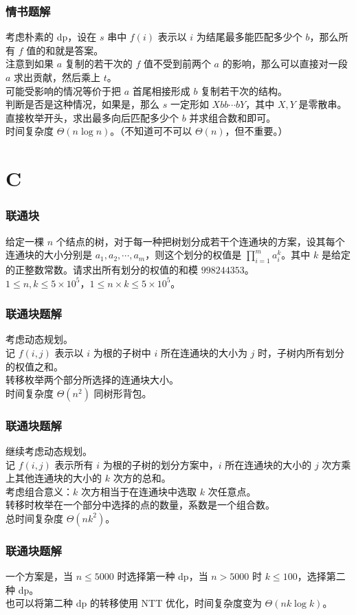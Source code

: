 \documentclass{beamer}
\begin{document}
\begin{frame}
\frametitle{情书题解}
考虑朴素的 dp，设在 $s$ 串中 $f(i)$ 表示以 $i$ 为结尾最多能匹配多少个 $b$，那么所有 $f$ 值的和就是答案。\\
\pause
注意到如果 $a$ 复制的若干次的 $f$ 值不受到前两个 $a$ 的影响，那么可以直接对一段 $a$ 求出贡献，然后乘上 $t$。\\
\pause
可能受影响的情况等价于把 $a$ 首尾相接形成 $b$ 复制若干次的结构。\\
\pause
判断是否是这种情况，如果是，那么 $s$ 一定形如 $Xbb\cdots bY$，其中 $X,Y$ 是零散串。直接枚举开头，求出最多向后匹配多少个 $b$ 并求组合数和即可。\\
\pause
时间复杂度 $\Theta(n\log n)$。（不知道可不可以 $\Theta(n)$，但不重要。）
\end{frame}

\section{C}

\begin{frame}
\frametitle{联通块}
给定一棵 $n$ 个结点的树，对于每一种把树划分成若干个连通块的方案，设其每个连通块的大小分别是 $a_1, a_2, \cdots, a_m$，则这个划分的权值是 $\prod\limits_{i=1}^{m} a_i^k$。其中 $k$ 是给定的正整数常数。请求出所有划分的权值的和模 $998244353$。\\
$1 \leq n, k \leq 5 \times 10^5$，$1 \leq n \times k \leq 5 \times 10^5$。
\end{frame}

\begin{frame}
\frametitle{联通块题解}
考虑动态规划。\\
\pause
记 $f(i,j)$ 表示以 $i$ 为根的子树中 $i$ 所在连通块的大小为 $j$ 时，子树内所有划分的权值之和。\\
\pause
转移枚举两个部分所选择的连通块大小。\\
\pause
时间复杂度 $\Theta(n^2)$ 同树形背包。
\end{frame}

\begin{frame}
\frametitle{联通块题解}
继续考虑动态规划。\\
\pause
记 $f(i,j)$ 表示所有 $i$ 为根的子树的划分方案中，$i$ 所在连通块的大小的 $j$ 次方乘上其他连通块的大小的 $k$ 次方的总和。\\
\pause
考虑组合意义：$k$ 次方相当于在连通块中选取 $k$ 次任意点。\\
\pause
转移时枚举在一个部分中选择的点的数量，系数是一个组合数。\\
\pause
总时间复杂度 $\Theta(n k^2)$。
\end{frame}

\begin{frame}
\frametitle{联通块题解}
一个方案是，当 $n \leq 5000$ 时选择第一种 dp，当 $n > 5000$ 时 $k \leq 100$，选择第二种 dp。\\
\pause
也可以将第二种 dp 的转移使用 NTT 优化，时间复杂度变为 $\Theta(nk \log k)$。
\end{frame}
\end{document}
